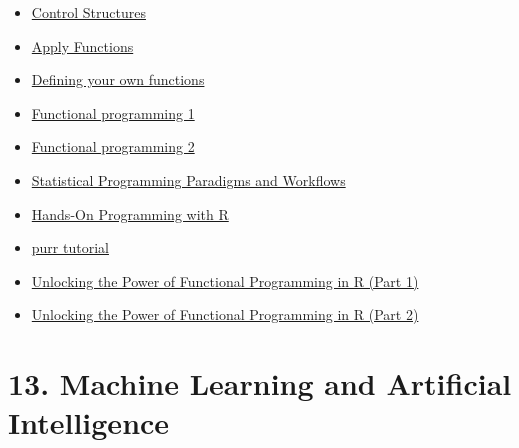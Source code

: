\documentclass[
  letterpaper,
  DIV=11,
  numbers=noendperiod]{scrreprt}
\providecommand{\tightlist}{%
  \setlength{\itemsep}{0pt}\setlength{\parskip}{0pt}}\usepackage{longtable,booktabs,array}
\begin{document}
\begin{itemize}
\tightlist
\item
  \href{https://cran.r-project.org/doc/manuals/r-release/R-lang.html\#Control-structures}{Control
  Structures}
\item
  \href{https://www.rdocumentation.org/packages/base/versions/3.6.2/topics/apply}{Apply
  Functions}
\item
  \href{https://modern-rstats.eu/defining-your-own-functions.html}{Defining
  your own functions}
\item
  \href{https://modern-rstats.eu/functional-programming.html}{Functional
  programming 1}
\item
  \href{http://adv-r.had.co.nz/Functional-programming.html}{Functional
  programming 2}
\item
  \href{https://www.stephaniehicks.com/jhustatprogramming2022/schedule}{Statistical
  Programming Paradigms and Workflows}
\item
  \href{https://jjallaire.github.io/hopr/}{Hands-On Programming with R}
\item
  \href{https://jennybc.github.io/purrr-tutorial/index.html}{purr
  tutorial}
\item
  \href{https://appsilon.com/functional-programming-in-r-part-1/}{Unlocking
  the Power of Functional Programming in R (Part 1)}
\item
  \href{https://appsilon.com/functional-programming-in-r-part-2/}{Unlocking
  the Power of Functional Programming in R (Part 2)}
\end{itemize}

\hypertarget{machine-learning-and-artificial-intelligence}{%
\section*{13. Machine Learning and Artificial
Intelligence}\label{machine-learning-and-artificial-intelligence}}

\end{document}
